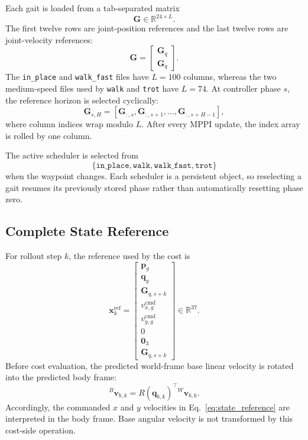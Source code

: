 \documentclass[11pt,a4paper]{article}
\newcommand{\R}{\mathbb{R}}
\newcommand{\code}[1]{\texttt{#1}}
\begin{document}
Each gait is loaded from a tab-separated matrix
\begin{equation}
  \bm{G}\in\R^{24\times L}.
\end{equation}
The first twelve rows are joint-position references and the last twelve rows
are joint-velocity references:
\begin{equation}
  \bm{G}=
  \begin{bmatrix}
    \bm{G}_q\\
    \bm{G}_{\dot q}
  \end{bmatrix}.
\end{equation}
The \code{in\_place} and \code{walk\_fast} files have $L=100$ columns,
whereas the two medium-speed files used by \code{walk} and \code{trot} have
$L=74$.  At controller phase $s$, the reference horizon is selected cyclically:
\begin{equation}
  \bm{G}_{s,H}=
  [\bm{G}_{:,s},\bm{G}_{:,s+1},\ldots,
  \bm{G}_{:,s+H-1}],
\end{equation}
where column indices wrap modulo $L$.  After every MPPI update, the index
array is rolled by one column.

The active scheduler is selected from
\begin{equation}
  \{\code{in\_place},\code{walk},\code{walk\_fast},\code{trot}\}
\end{equation}
when the waypoint changes.  Each scheduler is a persistent object, so
reselecting a gait resumes its previously stored phase rather than
automatically resetting phase zero.

\subsection{Complete State Reference}

For rollout step $k$, the reference used by the cost is
\begin{equation}
  \boxed{
  \bm{x}^{\mathrm{ref}}_k=
  \begin{bmatrix}
    \bm{p}_g\\
    \bm{q}_g\\
    \bm{G}_{q,s+k}\\
    v_{x,g}^{\mathrm{cmd}}\\
    v_{y,g}^{\mathrm{cmd}}\\
    0\\
    \bm{0}_3\\
    \bm{G}_{\dot q,s+k}
  \end{bmatrix}\in\R^{37}.}
  \label{eq:state_reference}
\end{equation}
Before cost evaluation, the predicted world-frame base linear velocity is
rotated into the predicted body frame:
\begin{equation}
  {}^B\bm{v}_{b,k}=R(\bm{q}_{b,k})^\top{}^W\bm{v}_{b,k}.
\end{equation}
Accordingly, the commanded $x$ and $y$ velocities in
Eq.~\eqref{eq:state_reference} are interpreted in the body frame.  Base
angular velocity is not transformed by this cost-side operation.
\end{document}

